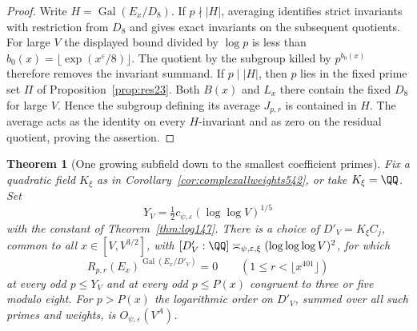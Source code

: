 \documentclass[a4paper,11pt]{article}
\newtheorem{theorem}[proposition]{Theorem}
\theoremstyle{definition}
\theoremstyle{remark}
\numberwithin{equation}{section}
\begin{document}
\begin{proof}
Write \(H=\operatorname{Gal}(E_x/D_8)\). If \(p\nmid |H|\),
averaging identifies strict invariants with restriction
from \(D_8\) and gives exact invariants on the subsequent
quotients. For large \(V\) the displayed bound divided by
\(\log p\) is less than
\(b_0(x)=\lfloor\exp(x^\varepsilon/8)\rfloor\).
The quotient by the subgroup killed by \(p^{b_0(x)}\)
therefore removes the invariant summand. If \(p\mid |H|\),
then \(p\) lies in the fixed prime set \(\Pi\) of
Proposition~\ref{prop:res23}. Both \(B(x)\) and \(L_x\)
there contain the fixed \(D_8\) for large \(V\). Hence the
subgroup defining its average \(J_{p,r}\) is contained in
\(H\). The average acts as the identity on every \(H\)-invariant
and as zero on the residual quotient, proving the assertion.
\end{proof}

\begin{theorem}[One growing subfield down to the smallest coefficient primes]
\leavevmode\label{thm:allprimeslayers543}
Fix a quadratic field \(K_\xi\) as in
Corollary~\ref{cor:complexallweights542}, or take \(K_\xi=\QQ\).
Set
\[
        Y_V=\tfrac12c_{\psi,\varepsilon}(\log\log V)^{1/5}
\]
with the constant of Theorem~\ref{thm:log147}.
There is a choice of \(D'_V=K_\xi C_j\), common to all
\(x\in[V,V^{3/2}]\), with
\([D'_V:\QQ]\asymp_{\psi,\varepsilon,\xi}
(\log\log\log V)^2\), for which
\[
   R_{p,r}(E_x)^{\operatorname{Gal}(E_x/D'_V)}=0
           \qquad(1\le r<\lfloor x^{401}\rfloor)
\]
at every odd \(p\le Y_V\) and at every odd \(p\le P(x)\)
congruent to three or five modulo eight. For \(p>P(x)\) the
logarithmic order on \(D'_V\), summed over all such primes and
weights, is \(O_{\psi,\varepsilon}(V^A)\).
\end{theorem}
\end{document}
